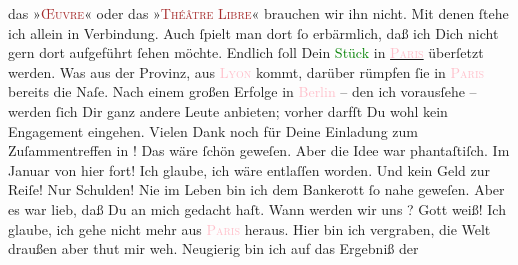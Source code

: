                das »\textsc{\textcolor{brown}{Œuvre}{}\ledrightnote{\textcolor{brown}{Théâtre de l’Œuvre}}}« oder das »\textsc{\textcolor{brown}{Théâtre Libre}{}\ledrightnote{\textcolor{brown}{Théâtre Libre}}}« brauchen wir ihn nicht. Mit denen ſtehe ich allein in Verbindung. Auch ſpielt
               man dort ſo erbärmlich, daß ich Dich nicht gern dort aufgeführt ſehen {\pb}möchte. Endlich ſoll Dein \textcolor{green}{Stück}{} in \textsc{\uline{\textcolor{pink}{Paris}{}\ledrightnote{\textcolor{pink}{Paris}}}} überſetzt werden. Was aus der Provinz, aus \textsc{\textcolor{pink}{Lyon}{}\ledrightnote{\textcolor{pink}{Lyon}}} kommt, darüber rümpfen ſie in \textsc{\textcolor{pink}{Paris}{}\ledrightnote{\textcolor{pink}{Paris}}} bereits die Naſe. Nach einem großen Erfolge in \textcolor{pink}{Berlin}{}\ledrightnote{\textcolor{pink}{Berlin}} – den ich \strikeout{\textcolor{gray}{×}} vorausſehe – werden ſich Dir ganz andere Leute anbieten; vorher darfſt Du wohl
               kein Engagement eingehen.\pend
           \pstart
           {\pb}Vielen Dank noch für Deine Einladung zum
               Zuſammentreffen in \label{K_L02762-5v}\label{K_L02762-5h}! Das wäre ſchön
               geweſen. Aber die Idee war phantaſtiſch. Im Januar von
               hier fort! Ich glaube, ich wäre entlaſſen worden. Und kein Geld zur Reiſe! Nur
               Schulden! Nie im Leben bin ich dem Bankerott ſo nahe geweſen. Aber es war lieb, daß
               Du an mich gedacht haſt. Wann {\pb}werden wir uns
                  \label{K_L02762-7v}\label{K_L02762-7h}? Gott weiß! Ich
               glaube, ich gehe nicht mehr aus \textsc{\textcolor{pink}{Paris}{}\ledrightnote{\textcolor{pink}{Paris}}} heraus. Hier bin ich vergraben, die Welt draußen aber thut mir  weh. Neugierig bin ich auf das Ergebniß der
